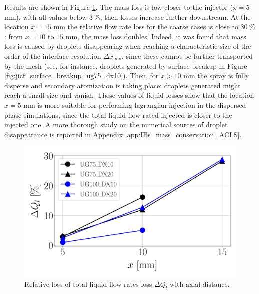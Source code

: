 Results are shown in Figure \ref{fig:delta_Ql_with_x}. The mass loss is low closer to the injector ($x = 5$ mm), with all values below $3~\%$, then losses increase further downstream.  At the location $x = 15$ mm the relative flow rate loss for the coarse cases is close to $30~\%$: from $x = 10$ to $15$ mm, the mass loss doubles. Indeed, it was found that mass loss is caused by droplets disappearing when reaching a characteristic size of the order of the interface resolution $\Delta x_\mathrm{min}$, since these cannot be further transported by the mesh (see, for instance, droplets generated by surface breakup in Figure \ref{fig:jicf_surface_breakup_ug75_dx10}). Then, for $x > 10$ mm the spray is fully disperse and secondary atomization is taking place: droplets generated might reach a small size and vanish. These values of liquid losses show that the location $x = 5$ mm is more suitable for performing lagrangian injection in the dispersed-phase simulations, since the total liquid flow rated injected is closer to the injected one. A more thorough study on the numerical sources of droplet disappearance is reported in Appendix \ref{app:IBs_mass_conservation_ACLS}.

\vspace*{-0.1in}

\begin{figure}[ht]
	\centering
   \includegraphics[scale=0.3]{./part2_developments/figures_ch5_resolved_JICF/flow_rates_ibs/Ql_loss_with_x}
   \vspace*{-0.2in}
   \caption{Relative loss of total liquid flow rates loss $\Delta Q_l$ with axial distance.}
   \label{fig:delta_Ql_with_x}
\end{figure}

